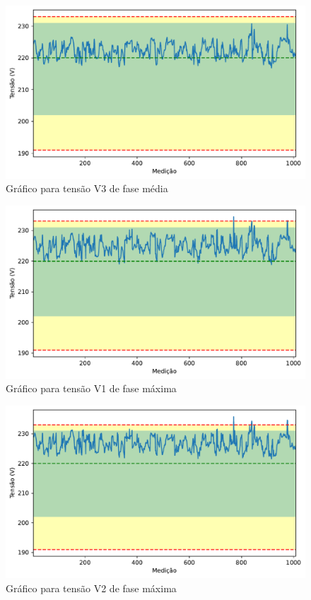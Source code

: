 \begin{figure}[H]
	\centering
	\caption{Gráfico para tensão V3 de fase média}
    \includegraphics[width=16cm]{illustrations/figures/a2_V3_Avg.pdf}
\end{figure}

\begin{figure}[H]
	\centering
	\caption{Gráfico para tensão V1 de fase máxima}
    \includegraphics[width=16cm]{illustrations/figures/a2_V1_Max.pdf}
\end{figure}

\begin{figure}[H]
	\centering
	\caption{Gráfico para tensão V2 de fase máxima}
    \includegraphics[width=16cm]{illustrations/figures/a2_V2_Max.pdf}
\end{figure}

